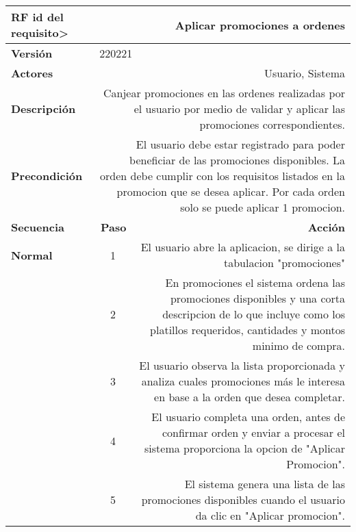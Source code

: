 \documentclass[conference]{IEEEtran}
\begin{document}
\begin{table}[H]
  \centering
  \begin{adjustbox}{width=0.47\textwidth}
    \begin{tabular}{|p{11.215em}|r|r|}
    \toprule
    \textbf{RF id del requisito>} & \multicolumn{2}{p{37.43em}|}{\textbf{Aplicar promociones a ordenes}} \\
    \midrule
    \textbf{Versión} & \multicolumn{2}{l|}{220221} \\
    \midrule
    \textbf{Actores} & \multicolumn{2}{p{37.43em}|}{Usuario, Sistema} \\
    \midrule
    \textbf{Descripción} & \multicolumn{2}{p{37.43em}|}{Canjear promociones en las ordenes realizadas por el usuario por medio de validar y aplicar las promociones correspondientes.} \\
    \midrule
    \textbf{Precondición} & \multicolumn{2}{p{37.43em}|}{El usuario debe estar registrado para poder beneficiar de las promociones disponibles. La orden debe cumplir con los requisitos listados en la promocion que se desea aplicar. Por cada orden solo se puede aplicar 1 promocion.} \\
    \midrule
    \textbf{Secuencia} & \multicolumn{1}{p{5.43em}|}{\textbf{Paso}} & \multicolumn{1}{p{32em}|}{\textbf{Acción}} \\
    \midrule
    \textbf{Normal} & \multicolumn{1}{c|}{1} & \multicolumn{1}{p{32em}|}{El usuario abre la aplicacion, se dirige a la tabulacion "promociones"} \\
    \midrule
    \multicolumn{1}{|r|}{} & \multicolumn{1}{c|}{2} & \multicolumn{1}{p{32em}|}{En promociones el sistema ordena las promociones disponibles y una corta descripcion de lo que incluye como los platillos requeridos, cantidades y montos minimo de compra.} \\
    \midrule
    \multicolumn{1}{|r|}{} & \multicolumn{1}{c|}{3} & \multicolumn{1}{p{32em}|}{El usuario observa la lista proporcionada y analiza cuales promociones más le interesa en base a la orden que desea completar.} \\
    \midrule
    \multicolumn{1}{|r|}{} & \multicolumn{1}{c|}{4} & \multicolumn{1}{p{32em}|}{El usuario completa una orden, antes de confirmar orden y enviar a procesar el sistema proporciona la opcion de "Aplicar Promocion".} \\
    \midrule
    \multicolumn{1}{|r|}{} & \multicolumn{1}{c|}{5} & \multicolumn{1}{p{32em}|}{El sistema genera una lista de las promociones disponibles cuando el usuario da clic en "Aplicar promocion". } \\

\end{tabular}
\end{adjustbox}
\end{table}
\end{document}

